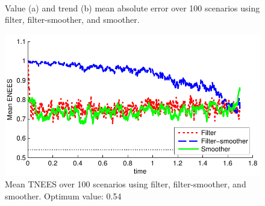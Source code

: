 \documentclass[10pt,twocolumn,twoside]{IEEEtran}
\begin{document}
\begin{figure}[!t]
\centering
{} \\
\caption{Value (a) and trend (b) mean absolute error over 100 scenarios using filter, filter-smoother, and smoother.}
\label{fig:finance_rmse}
\end{figure}
%
\begin{figure}[!t]
\centering
\includegraphics[width=0.9\columnwidth]{finance_mtnees.pdf}
\caption{Mean TNEES over 100 scenarios using filter, filter-smoother, and smoother. Optimum value: 0.54}
\label{fig:finance_mtnees}
\end{figure}
\end{document}
